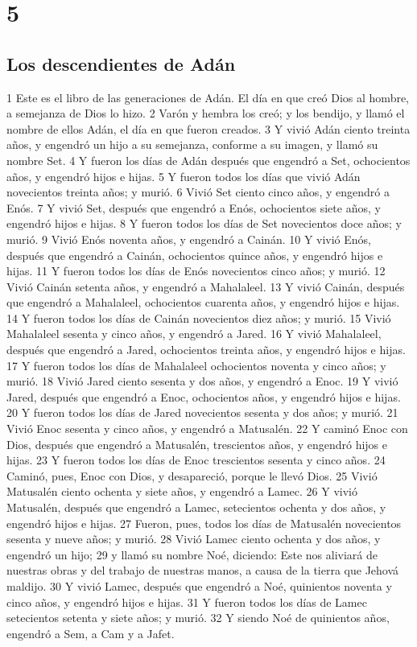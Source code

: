\chapter{5}

\section{Los descendientes de Adán}

1 Este es el libro de las generaciones de Adán. El día en que creó Dios al hombre, a semejanza de Dios lo hizo.
2 Varón y hembra los creó; y los bendijo, y llamó el nombre de ellos Adán, el día en que fueron creados.
3 Y vivió Adán ciento treinta años, y engendró un hijo a su semejanza, conforme a su imagen, y llamó su nombre Set.
4 Y fueron los días de Adán después que engendró a Set, ochocientos años, y engendró hijos e hijas.
5 Y fueron todos los días que vivió Adán novecientos treinta años; y murió.
6 Vivió Set ciento cinco años, y engendró a Enós.
7 Y vivió Set, después que engendró a Enós, ochocientos siete años, y engendró hijos e hijas.
8 Y fueron todos los días de Set novecientos doce años; y murió.
9 Vivió Enós noventa años, y engendró a Cainán.
10 Y vivió Enós, después que engendró a Cainán, ochocientos quince años, y engendró hijos e hijas.
11 Y fueron todos los días de Enós novecientos cinco años; y murió.
12 Vivió Cainán setenta años, y engendró a Mahalaleel.
13 Y vivió Cainán, después que engendró a Mahalaleel, ochocientos cuarenta años, y engendró hijos e hijas.
14 Y fueron todos los días de Cainán novecientos diez años; y murió.
15 Vivió Mahalaleel sesenta y cinco años, y engendró a Jared.
16 Y vivió Mahalaleel, después que engendró a Jared, ochocientos treinta años, y engendró hijos e hijas.
17 Y fueron todos los días de Mahalaleel ochocientos noventa y cinco años; y murió.
18 Vivió Jared ciento sesenta y dos años, y engendró a Enoc.
19 Y vivió Jared, después que engendró a Enoc, ochocientos años, y engendró hijos e hijas.
20 Y fueron todos los días de Jared novecientos sesenta y dos años; y murió.
21 Vivió Enoc sesenta y cinco años, y engendró a Matusalén.
22 Y caminó Enoc con Dios, después que engendró a Matusalén, trescientos años, y engendró hijos e hijas.
23 Y fueron todos los días de Enoc trescientos sesenta y cinco años.
24 Caminó, pues, Enoc con Dios, y desapareció, porque le llevó Dios.
25 Vivió Matusalén ciento ochenta y siete años, y engendró a Lamec.
26 Y vivió Matusalén, después que engendró a Lamec, setecientos ochenta y dos años, y engendró hijos e hijas.
27 Fueron, pues, todos los días de Matusalén novecientos sesenta y nueve años; y murió.
28 Vivió Lamec ciento ochenta y dos años, y engendró un hijo;
29 y llamó su nombre Noé, diciendo: Este nos aliviará de nuestras obras y del trabajo de nuestras manos, a causa de la tierra que Jehová maldijo.
30 Y vivió Lamec, después que engendró a Noé, quinientos noventa y cinco años, y engendró hijos e hijas.
31 Y fueron todos los días de Lamec setecientos setenta y siete años; y murió.
32 Y siendo Noé de quinientos años, engendró a Sem, a Cam y a Jafet.


